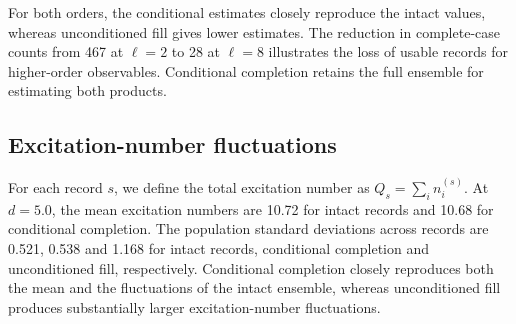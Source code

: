 \documentclass[11pt,a4paper]{article}
\newcommand{\subhead}[1]{\subsection*{#1}}
\begin{document}
For both orders, the conditional estimates closely reproduce the
intact values, whereas unconditioned fill gives lower estimates.
The reduction in complete-case counts from 467 at $\ell=2$ to
28 at $\ell=8$ illustrates the loss of usable records for higher-order
observables. Conditional completion retains the full ensemble
for estimating both products.

\subhead{Excitation-number fluctuations}
For each record $s$, we define the total excitation number as
$Q_s=\sum_i n_i^{(s)}$. At $d=5.0$, the mean excitation numbers
are 10.72 for intact records and 10.68 for conditional completion.
The population standard deviations across records are 0.521,
0.538 and 1.168 for intact records, conditional completion and
unconditioned fill, respectively. Conditional completion closely
reproduces both the mean and the fluctuations of the intact ensemble,
whereas unconditioned fill produces substantially larger
excitation-number fluctuations.


{}

\end{document}
